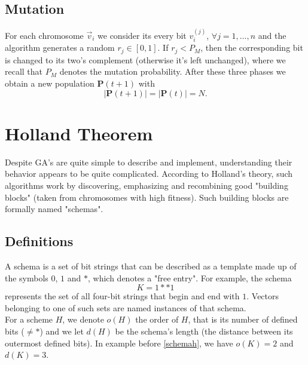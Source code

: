 \documentclass[%
    corpo=11pt,
    twoside,
    stile=classica,
    oldstyle,
    autoretitolo,
    tipotesi=magistrale,
    greek,
    evenboxes,
    english
]{toptesi}
\begin{document}
\subsection{Mutation}
For each chromosome $\vec{v}_i$ we consider its every bit $v_i^{(j)}$, $\forall j=1,\dots,n$ and the algorithm generates a random $r_j \in \left[0,1\right]$.
If $r_j < P_M$, then the corresponding bit is changed to its two's complement (otherwise it's left unchanged), where we recall that $P_M$ denotes the mutation probability. After these three phases we obtain a new population $\textbf{P}(t+1)$ with 
\begin{equation}
|\textbf{P}(t+1)|=|\textbf{P}(t)|=N.
\end{equation}
\newpage

\section{Holland Theorem}
Despite GA's are quite simple to describe and implement, understanding their behavior appears to be quite complicated. According to Holland's theory, such algorithms work by discovering, emphasizing and recombining good "building blocks" (taken from chromosomes with high fitness). Such building blocks are formally named "schemas". 
\subsection{Definitions}
A schema is a set of bit strings that can be described as a template made up of the symbols $0$, $1$ and $*$, which denotes a "free entry". For example, the schema
\begin{equation}
\label{schemah}
K = 1**1
\end{equation}
represents the set of all four-bit strings that begin and end with $1$. Vectors belonging to one of such sets are named instances of that schema. \\
For a scheme $H$, we denote $o(H)$ the order of $H$, that is its number of defined bits ($\neq *$) and we let $d(H)$ be the schema's length (the distance between its outermost defined bits). In example before \eqref{schemah}, we have $o(K)=2$ and $d(K)=3$.
\end{document}
